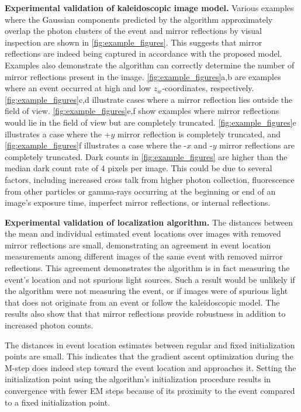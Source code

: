 \noindent
\textbf{Experimental validation of kaleidoscopic image model.}
Various examples where the Gaussian components predicted by the 
algorithm approximately overlap the photon clusters of the event and mirror 
reflections by visual inspection are shown in \cref{fig:example_figures}.
This suggests that mirror reflections are indeed being captured in accordance with 
the proposed model.
Examples also demonstrate the algorithm can correctly determine the number of 
mirror reflections present in the image.
\cref{fig:example_figures}a,b are examples where an event occurred at high and 
low $z_w$-coordinates, respectively.
\cref{fig:example_figures}c,d illustrate cases where a mirror reflection lies 
outside the field of view. 
\cref{fig:example_figures}e,f show examples where mirror reflections would lie in 
the field of view but are completely truncated.
\cref{fig:example_figures}e illustrates a case where the +$y$ mirror reflection is 
completely truncated, and \cref{fig:example_figures}f illustrates a case where the 
-$x$ and -$y$ mirror reflections are completely truncated.
Dark counts in \cref{fig:example_figures} are higher than the median dark count 
rate of 4 pixels per image.
This could be due to several factors, including increased cross talk from higher 
photon collection, fluorescence from other particles or gamma-rays occurring at 
the beginning or end of an image's exposure time, imperfect mirror reflections, 
or internal reflections.

\noindent
\textbf{Experimental validation of localization algorithm.}
The distances between the mean and individual estimated event locations over 
images with removed mirror reflections are small, demonstrating an agreement in 
event location measurements among different images of the same event with removed 
mirror reflections.
This agreement demonstrates the algorithm is in fact measuring the event's 
location and not spurious light sources.
Such a result would be unlikely if the algorithm were not measuring the event, or 
if images were of spurious light that does not originate from an event or follow 
the kaleidoscopic model.
The results also show that that mirror reflections provide robustness in 
addition to increased photon counts.

The distances in event location estimates between regular and fixed 
initialization points are small.
This indicates that the gradient ascent optimization during the M-step does indeed 
step toward the event location and approaches it.
Setting the initialization point using the algorithm's initialization procedure 
results in convergence with fewer EM steps because of its proximity to the event 
compared to a fixed initialization point. 

